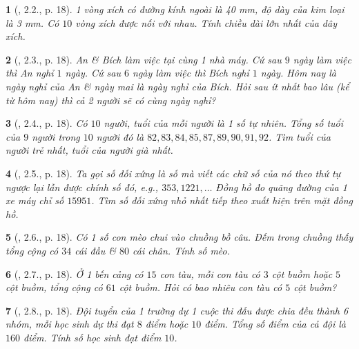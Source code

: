\documentclass{article}
\newtheorem{baitoan}{}
\begin{document}
\begin{baitoan}[\cite{TLCT_THCS_Toan_6_so_hoc}, 2.2., p. 18]
	1 vòng xích có đường kính ngoài là {\rm40 mm}, độ dày của kim loại là {\rm3 mm}. Có $10$ vòng xích được nối với nhau. Tính chiều dài lớn nhất của dây xích.
\end{baitoan}

\begin{baitoan}[\cite{TLCT_THCS_Toan_6_so_hoc}, 2.3., p. 18]
	An \& Bích làm việc tại cùng 1 nhà máy. Cứ sau $9$ ngày làm việc thì An nghỉ $1$ ngày. Cứ sau $6$ ngày làm việc thì Bích nghỉ $1$ ngày. Hôm nay là ngày nghỉ của An \& ngày mai là ngày nghỉ của Bích. Hỏi sau ít nhất bao lâu (kể từ hôm nay) thì cả 2 người sẽ có cùng ngày nghỉ?
\end{baitoan}

\begin{baitoan}[\cite{TLCT_THCS_Toan_6_so_hoc}, 2.4., p. 18]
	Có $10$ người, tuổi của mỗi người là 1 số tự nhiên. Tổng số tuổi của $9$ người trong $10$ người đó là $82,83,84,85,87,89,90,91,92$. Tìm tuổi của người trẻ nhất, tuổi của người già nhất.	
\end{baitoan}

\begin{baitoan}[\cite{TLCT_THCS_Toan_6_so_hoc}, 2.5., p. 18]
	Ta gọi {\rm số đối xứng} là số mà viết các chữ số của nó theo thứ tự ngược lại lẫn được chính số đó, e.g., $353,1221,\ldots$ Đồng hồ đo quãng đường của 1 xe máy chỉ số $15951$. Tìm số đối xứng nhỏ nhất tiếp theo xuất hiện trên mặt đồng hồ.	
\end{baitoan}

\begin{baitoan}[\cite{TLCT_THCS_Toan_6_so_hoc}, 2.6., p. 18]
	Có 1 số con mèo chui vào chuồng bồ câu. Đếm trong chuồng thấy tổng cộng có $34$ cái đầu \& $80$ cái chân. Tính số mèo.
\end{baitoan}

\begin{baitoan}[\cite{TLCT_THCS_Toan_6_so_hoc}, 2.7., p. 18]
	Ở 1 bến cảng có $15$ con tàu, mỗi con tàu có $3$ cột buồm hoặc $5$ cột buồm, tổng cộng có $61$ cột buồm. Hỏi có bao nhiêu con tàu có $5$ cột buồm?
\end{baitoan}

\begin{baitoan}[\cite{TLCT_THCS_Toan_6_so_hoc}, 2.8., p. 18]
	Đội tuyển của 1 trường dự 1 cuộc thi đấu được chia đều thành 6 nhóm, mỗi học sinh dự thi đạt $8$ điểm hoặc $10$ điểm. Tổng số điểm của cả đội là $160$ điểm. Tính số học sinh đạt điểm $10$.
\end{baitoan}
\end{document}
